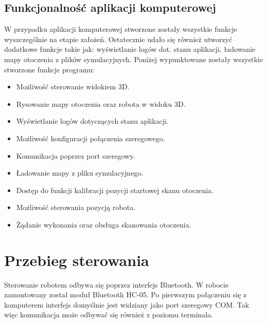 \documentclass[a4paper]{article}
\begin{document}
\subsection{Funkcjonalność aplikacji komputerowej}
W przypadku aplikacji komputerowej stworzone zostały wszystkie funkcje wyszczególnie na etapie założeń. Ostatecznie udało się również utworzyć dodatkowe funkcje takie jak: wyświetlanie logów dot. stanu aplikacji, ładowanie mapy otoczenia z plików symulacyjnych. Poniżej wypunktowane zostały wszystkie stworzone funkcje programu:
\begin{itemize}
\item Możliwość sterowanie widokiem 3D.
\item Rysowanie mapy otoczenia oraz robota w widoku 3D.
\item Wyświetlanie logów dotyczących stanu aplikacji.
\item Możliwość konfiguracji połączenia szeregowego.
\item Komunikacja poprzez port szeregowy.
\item Ładowanie mapy z pliku symulacyjnego.
\item Dostęp do funkcji kalibracji pozycji startowej skanu otoczenia.
\item Możliwość sterowania pozycją robota.
\item Żądanie wykonania oraz obsługa skanowania otoczenia.
\end{itemize}

\section{Przebieg sterowania}
Sterowanie robotem odbywa się poprzez interfejs Bluetooth. W robocie zamontowany został moduł Bluetooth HC-05. Po pierwszym połączeniu się z komputerem interfejs domyślnie jest widziany jako port szeregowy COM. 
Tak więc komunikacja może odbywać się również z poziomu terminala. 
\end{document}
